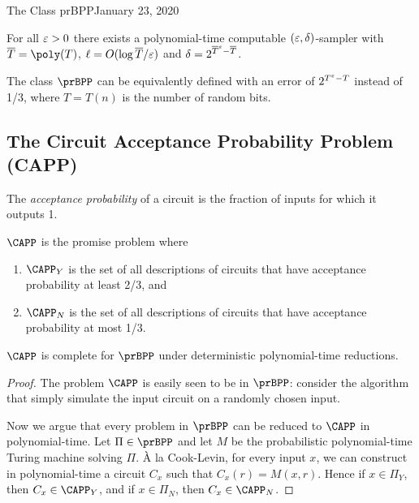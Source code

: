 \begin{lecture}{1}{The Class prBPP}{January 23, 2020}
\begin{theorem}
  For all $\varepsilon > 0$ there exists a polynomial-time computable $(\varepsilon,
  \delta)$-sampler with $\overline{T} = \poly(T)$, $\ell = O(\log
  \overline{T}/\varepsilon)$ and $\delta = 2^{\overline{T}^\varepsilon - \overline{T}}$.
\end{theorem}

\begin{corollary}
  The class $\prBPP$ can be equivalently defined with an error of $2^{T^\varepsilon -
  T}$ instead of 1/3, where $T = T(n)$ is the number of random bits.
\end{corollary}

\subsection{The Circuit Acceptance Probability Problem (CAPP)}

The \emph{acceptance probability} of a circuit is the fraction of inputs for
which it outputs 1.

\begin{definition}[$\CAPP$]
  $\CAPP$ is the promise problem where
  \begin{enumerate}
    \item $\CAPP_Y$ is the set of all descriptions of circuits that have
      acceptance probability at least 2/3, and
    \item $\CAPP_N$ is the set of all descriptions of circuits that have
      acceptance probability at most 1/3.
  \end{enumerate}
\end{definition}

\begin{theorem}
  $\CAPP$ is complete for $\prBPP$ under deterministic polynomial-time reductions.
\end{theorem}


\begin{proof}
  The problem $\CAPP$ is easily seen to be in $\prBPP$: consider the algorithm
  that simply simulate the input circuit on a randomly chosen input.

  Now we argue that every problem in $\prBPP$ can be reduced to $\CAPP$ in
  polynomial-time. Let $\Pi \in \prBPP$ and let $M$ be the probabilistic
  polynomial-time Turing machine solving $\Pi$. {\`A} la Cook-Levin, for every
  input $x$, we can construct in polynomial-time a circuit $C_x$ such that
  $C_x(r) = M(x, r)$. Hence if $x \in \Pi_Y$, then $C_x \in \CAPP_Y$, and if $x
  \in \Pi_N$, then $C_x \in \CAPP_N$.
\end{proof}


\end{lecture}
